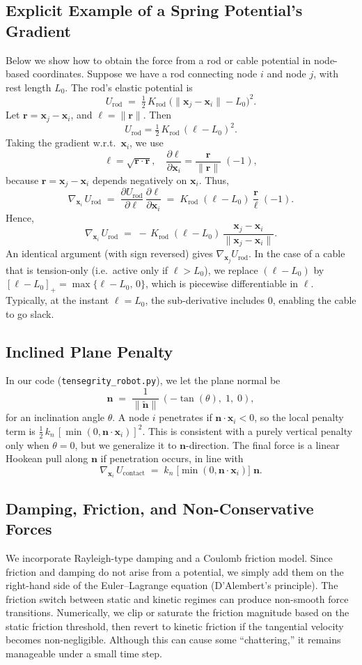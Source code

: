 \documentclass[12pt,letterpaper]{article}
\newcommand{\x}{\bm{x}}
\newcommand{\bfn}{\bm{n}}
\begin{document}
\subsection{Explicit Example of a Spring Potential’s Gradient}
Below we show how to obtain the force from a rod or cable potential in node-based coordinates. Suppose we have a rod connecting node $i$ and node $j$, with rest length $L_{0}$. The rod’s elastic potential is
\[
  U_{\mathrm{rod}} 
  \;=\;\tfrac12\, K_{\mathrm{rod}}\;\bigl( \|\x_j - \x_i\| - L_{0}\bigr)^2.
\]
Let $\bm{r} = \x_j - \x_i$, and $\ell = \|\bm{r}\|$. Then
\[
  U_{\mathrm{rod}} = \tfrac12\, K_{\mathrm{rod}}\, (\ell - L_{0})^2.
\]
Taking the gradient w.r.t.\ $\x_i$, we use
\[
  \ell = \sqrt{\bm{r}\cdot\bm{r}}, \quad
  \frac{\partial \ell}{\partial \x_i}
     = \frac{\bm{r}}{\|\bm{r}\|}\;(-1),
\]
because $\bm{r} = \x_j - \x_i$ depends negatively on $\x_i$. Thus,
\[
  \nabla_{\!\x_i}\,U_{\mathrm{rod}}
  \;=\;\frac{\partial U_{\mathrm{rod}}}{\partial \ell}\,
        \frac{\partial \ell}{\partial \x_i}
  \;=\; K_{\mathrm{rod}}\;(\ell - L_{0})\;\frac{\bm{r}}{\ell}\;(-1).
\]
Hence,
\[
  \nabla_{\!\x_i}\,U_{\mathrm{rod}}
  \;=\;-\,K_{\mathrm{rod}}\;(\ell - L_{0})\,\frac{\x_j - \x_i}{\|\x_j - \x_i\|}.
\]
An identical argument (with sign reversed) gives $\nabla_{\!\x_j} U_{\mathrm{rod}}$. In the case of a cable that is tension-only (i.e.\ active only if $\ell > L_0$), we replace $(\ell - L_0)$ by $[\ell - L_0]_+ = \max\{\ell - L_0,\,0\}$, which is piecewise differentiable in $\ell$. Typically, at the instant $\ell = L_0$, the sub-derivative includes $0$, enabling the cable to go slack.

\subsection{Inclined Plane Penalty}
In our code (\texttt{tensegrity\_robot.py}), we let the plane normal be
\[
  \bfn \;=\; \frac{1}{\|\tilde{\bfn}\|}\,( -\tan(\theta),\; 1,\; 0 ),
\]
for an inclination angle $\theta$. A node $i$ penetrates if $\bfn \cdot \x_i < 0$, so the local penalty term is $\tfrac12\,k_n \,[\min(0,\bfn \cdot \x_i)]^2$. This is consistent with a purely vertical penalty only when $\theta=0$, but we generalize it to $\bfn$-direction. The final force is a linear Hookean pull along $\bfn$ if penetration occurs, in line with
\[
  \nabla_{\!\x_i}\,U_{\mathrm{contact}}
  \;=\; k_n\;\bigl[\min(0,\bfn\cdot\x_i)\bigr]\;\bfn.
\]

\subsection{Damping, Friction, and Non-Conservative Forces}
We incorporate Rayleigh-type damping and a Coulomb friction model. Since friction and damping do not arise from a potential, we simply add them on the right-hand side of the Euler--Lagrange equation (D'Alembert’s principle). The friction switch between static and kinetic regimes can produce non-smooth force transitions. Numerically, we clip or saturate the friction magnitude based on the static friction threshold, then revert to kinetic friction if the tangential velocity becomes non-negligible. Although this can cause some “chattering,” it remains manageable under a small time step.
\end{document}
